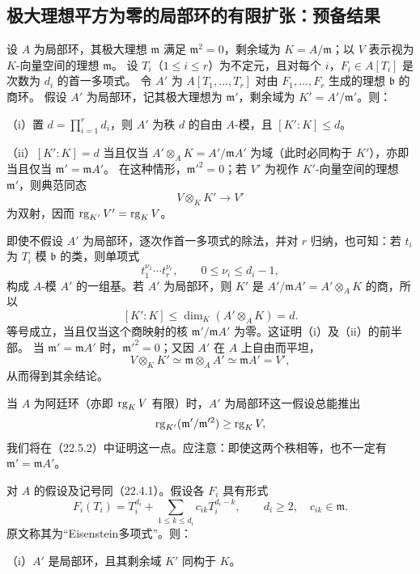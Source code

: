 \subsection{极大理想平方为零的局部环的有限扩张：预备结果}
设 $A$ 为局部环，其极大理想 $\mathfrak m$ 满足 $\mathfrak m^2=0$，剩余域为 $K=A/\mathfrak m$；以 $V$ 表示视为 $K$-向量空间的理想 $\mathfrak m$。
设 $T_i$（$1\le i\le r$）为不定元，且对每个 $i$，$F_i\in A[T_i]$ 是次数为 $d_i$ 的首一多项式。
令 $A'$ 为 $A[T_1,\ldots,T_r]$ 对由 $F_1,\ldots,F_r$ 生成的理想 $\mathfrak b$ 的商环。
假设 $A'$ 为局部环，记其极大理想为 $\mathfrak m'$，剩余域为 $K'=A'/\mathfrak m'$。则：

\noindent（i）置 $d=\prod_{i=1}^r d_i$，则 $A'$ 为秩 $d$ 的自由 $A$-模，且 $[K':K]\le d$。

\noindent（ii）$[K':K]=d$ 当且仅当 $A'\otimes_A K=A'/\mathfrak mA'$ 为域（此时必同构于 $K'$），亦即当且仅当 $\mathfrak m'=\mathfrak mA'$。
在这种情形，$\mathfrak m'^2=0$；若 $V'$ 为视作 $K'$-向量空间的理想 $\mathfrak m'$，则典范同态
\[
 V\otimes_K K'\longrightarrow V'
\]
为双射，因而 $\operatorname{rg}_{K'}V'=\operatorname{rg}_KV$。

\eproof
即使不假设 $A'$ 为局部环，逐次作首一多项式的除法，并对 $r$ 归纳，也可知：若 $t_i$ 为 $T_i$ 模 $\mathfrak b$ 的类，则单项式
\[
 t_1^{\nu_1}\cdots t_r^{\nu_r},\qquad 0\le\nu_i\le d_i-1,
\]
构成 $A$-模 $A'$ 的一组基。若 $A'$ 为局部环，则 $K'$ 是 $A'/\mathfrak mA'=A'\otimes_AK$ 的商，所以
\[
 [K':K]\le\dim_K(A'\otimes_AK)=d.
\]
等号成立，当且仅当这个商映射的核 $\mathfrak m'/\mathfrak mA'$ 为零。这证明（i）及（ii）的前半部。
当 $\mathfrak m'=\mathfrak mA'$ 时，$\mathfrak m'^2=0$；又因 $A'$ 在 $A$ 上自由而平坦，
\[
 V\otimes_KK'\simeq\mathfrak m\otimes_AA'\simeq\mathfrak mA'=V',
\]
从而得到其余结论。
\finishproof

当 $A$ 为阿廷环（亦即 $\operatorname{rg}_KV$ 有限）时，$A'$ 为局部环这一假设总能推出
\[
 \operatorname{rg}_{K'}(\mathfrak m'/\mathfrak m'^2)\ge\operatorname{rg}_KV,
\]
我们将在（22.5.2）中证明这一点。应注意：即使这两个秩相等，也不一定有 $\mathfrak m'=\mathfrak mA'$。

对 $A$ 的假设及记号同（22.4.1）。假设各 $F_i$ 具有形式
\begin{equation}
 F_i(T_i)=T_i^{d_i}+\sum_{1\le k\le d_i}c_{ik}T_i^{d_i-k},
 \qquad d_i\ge2,\quad c_{ik}\in\mathfrak m.
 \tag{22.4.3.1}
\end{equation}
原文称其为“Eisenstein多项式”。则：

\noindent（i）$A'$ 是局部环，且其剩余域 $K'$ 同构于 $K$。

